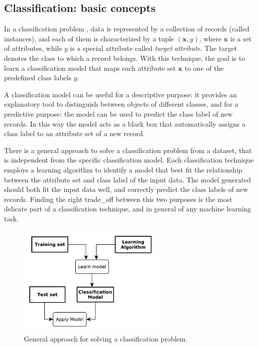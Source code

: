 \documentclass{llncs}
\begin{document}
\subsection{Classification: basic concepts}\label{classifBasicConcept}

In a classification problem \cite{5}, data is represented by a collection of records (called instances), and each of them is characterized by a tuple $(\mathbf{x},y)$, where $\mathbf{x}$ is a set of attributes, while $y$ is a special attribute called \emph{target attribute}. The target denotes the class to which a record belongs. With this technique, the goal is to learn a classification model that maps each attribute set $\mathbf{x}$ to one of the predefined class labels $y$.

A classification model can be useful for a descriptive purpose: it provides an explanatory tool to distinguish between objects of different classes, and for a predictive purpose: the model can be used to predict the class label of new records. In this way the model acts as a black box that automatically assigns a class label to an attribute set of a new record.

There is a general approach to solve a classification problem from a dataset, that is independent from the specific classification model. Each classification technique employs a learning algorithm to identify a model that best fit the relationship between the attribute set and class label of the input data. The model generated should both fit the input data well, and correctly predict the class labels of new records. Finding the right trade\_off between this two purposes is the most delicate part of a classification technique, and in general of any machine learning task.

\begin{figure}[h]
\centering
\includegraphics[width=200pt]
{./items/classifApproach.pdf}
\caption{General approach for solving a classification problem.}
\label{figclassApproach}
\end{figure}
\end{document}
